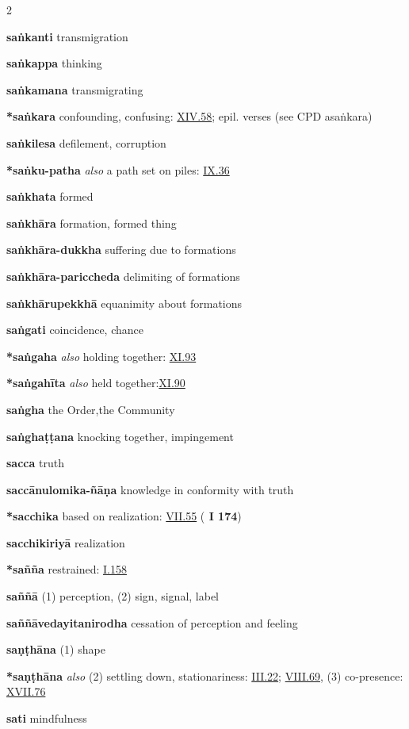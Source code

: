 \begin{multicols}{2}
\begin{vismHanging}
\par\textbf{saṅkanti} transmigration
\par\textbf{saṅkappa} thinking
\par\textbf{saṅkamana} transmigrating
\par\textbf{*saṅkara} confounding, confusing: \hyperlink{XIV.58}{XIV.58}{}; epil. verses (see CPD asaṅkara) 
\par\textbf{saṅkilesa} defilement, corruption
\par\textbf{*saṅku-patha} \emph{also }a path set on piles: \hyperlink{IX.36}{IX.36}{} 
\par\textbf{saṅkhata} formed
\par\textbf{saṅkhāra} formation, formed thing
\par\textbf{saṅkhāra-dukkha} suffering due to formations 
\par\textbf{saṅkhāra-pariccheda} delimiting of formations 
\par\textbf{saṅkhārupekkhā} equanimity about formations 
\par\textbf{saṅgati} coincidence, chance
\par\textbf{*saṅgaha} \emph{also }holding together: \hyperlink{XI.93}{XI.93}{}
\par\textbf{*saṅgahīta} \emph{also }held together:\hyperlink{XI.90}{XI.90}{}
\par\textbf{saṅgha} the Order,the Community
\par\textbf{saṅghaṭṭana} knocking together, impingement 
\par\textbf{sacca} truth
\par\textbf{saccānulomika-ñāṇa} knowledge in conformity with truth 
\par\textbf{*sacchika} based on realization: \hyperlink{VII.55}{VII.55}{} (\textbf{\cite{Paṭis} I 174}) 
\par\textbf{sacchikiriyā} realization
\par\textbf{*sañña} restrained: \hyperlink{I.158}{I.158}{} 
\par\textbf{saññā} (1) perception, (2) sign, signal, label 
\par\textbf{saññāvedayitanirodha} cessation of perception and feeling
\par\textbf{saṇṭhāna} (1) shape
\par\textbf{*saṇṭhāna} \emph{also }(2) settling down, stationariness: \hyperlink{III.22}{III.22}{}; \hyperlink{VIII.69}{VIII.69}{}, (3) co-presence: \hyperlink{XVII.76}{XVII.76}{} 
\par\textbf{sati} mindfulness

\end{vismHanging}
\end{multicols}
